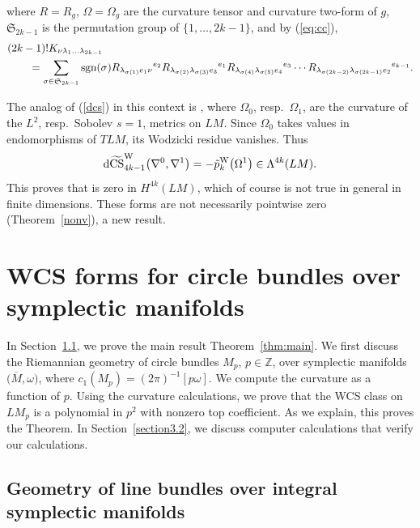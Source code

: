 \documentclass[pdftex]{sigma}
\numberwithin{equation}{section}
\theoremstyle{definition}
\newcommand{\BbZ}{{\mathbb Z}}
\newcommand{\Z}{\BbZ}
\newcommand{\ocs}{\widetilde{{\rm CS}}}
\newcommand{\tp}{\tilde p}
\newcommand{\sgn}{{\rm sgn}}
\newcommand{\om}{\overline{M}}
\newcommand{\omp}{M_p}
\begin{document}
\noindent where $R = R_g$, $\Omega = \Omega_g$ are the curvature tensor and curvature two-form of $g$,
 $\mathfrak S_{2k-1}$ is the permutation group of $\{1,\dots,2k-1\}$,
and by (\ref{eq:cc}),
\begin{align}\label{K_tensor}
& (2k-1)!K_{\nu \lambda_1 \dots \lambda_{2k-1}} \\
&\qquad{}= \sum_{\sigma\in \mathfrak S_{2k-1} } \sgn({\sigma})
R_{\lambda_{\sigma (1)} e_1 \nu}{}^{e_{2}}
R_{\lambda_{\sigma (2) } \lambda_{\sigma (3)} e_{3}}{}^{e_1}
R_{\lambda_{\sigma (4) } \lambda_{\sigma (5)} e_{4}}{}^{e_{3}}
\cdots
R_{\lambda_{\sigma (2k-2) } \lambda_{\sigma (2k-1)} e_{2}}{}^{e_{k-1}}.
\nonumber
\end{align}



The analog of (\ref{dcs}) in this context is
\smash{${\rm d}\ocs^{\rm W}_{4k-1}\bigl(\nabla^0,\nabla^1\bigr) = \tp^{\rm W}_k\bigl(\Omega^0\bigr) - \tp^{\rm W}_k\bigl(\Omega^1\bigr)$},
where $\Omega_0$, resp.~$\Omega_1$, are the curvature of the $L^2$, resp.~Sobolev $s=1$, metrics on $LM$.
Since $\Omega_0$ takes values in endomorphisms of $TLM$, its Wodzicki residue vanishes. Thus
\begin{equation}\label{dwcs}
{\rm d}\ocs^{\rm W}_{4k-1}\bigl(\nabla^0,\nabla^1\bigr) = - \tp_k^{\rm W}\bigl(\Omega^1\bigr)\in \Lambda^{4k}(LM).
\end{equation}
This proves that \smash{$\bigl[\tp_k^{\rm W}\bigl(\Omega^1\bigr)\bigr]$} is zero in $H^{4k}(LM)$, which of course is not true in general in finite dimensions. These forms are not necessarily pointwise zero (Theorem~\ref{nonv}), a new result.

\section{WCS forms for circle bundles over symplectic manifolds}\label{section3}

In Section~\ref{section3.1}, we prove the main result Theorem~\ref{thm:main}. We first discuss the Riemannian geometry of circle bundles $\omp$, $p\in \Z$, over symplectic manifolds $\bigl(\om,\omega\bigr)$, where $c_1(\omp) = (2\pi)^{-1}[p\omega]$. We compute the curvature as a function of $p$. Using the curvature calculations, we prove that the WCS class on $L\omp$ is a polynomial in $p^2$ with nonzero top coefficient. As we explain, this proves the Theorem. In Section~\ref{section3.2}, we discuss computer calculations that verify our calculations.


\subsection{Geometry of line bundles over integral symplectic manifolds}\label{section3.1}
\end{document}
